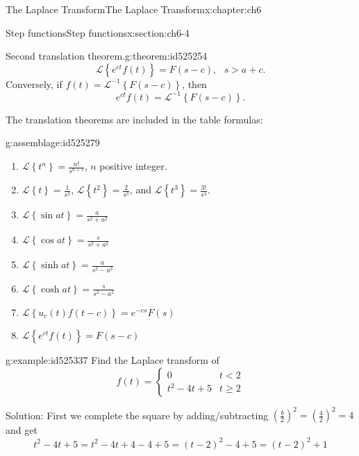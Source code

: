 \documentclass[oneside,10pt,]{book}
\numberwithin{equation}{section}
\numberwithin{equation}{section}
\newcommand{\lt}{<}
\newcommand{\amp}{&}
\begin{document}
\begin{chapterptx}{The Laplace Transform}{}{The Laplace Transform}{}{}{x:chapter:ch6}
\begin{sectionptx}{Step functions}{}{Step functions}{}{}{x:section:ch6-4}
\begin{theorem}{Second translation theorem.}{}{g:theorem:id525254}
\begin{equation*}
\mathcal{L}\left\{ e^{ct}f\left(t\right)\right\} =F(s-c),\,\,\,\,s>a+c.
\end{equation*}
Conversely, if \(f(t)=\mathcal{L}^{-1}\left\{ F(s-c)\right\} \), then%
\begin{equation*}
e^{ct}f(t)=\mathcal{L}^{-1}\left\{ F(s-c)\right\} .
\end{equation*}
%
\end{theorem}
The translation theorems are included in the table formulas:%
\begin{assemblage}{}{g:assemblage:id525279}%
%
\begin{enumerate}
\item{}\(\mathcal{L}\left\{ t^{n}\right\} =\frac{n!}{s^{n+1}}\), \(n\) positive integer.%
\item{}\(\mathcal{L}\left\{ t\right\} =\frac{1}{s^{2}}\), \(\mathcal{L}\left\{ t^{2}\right\} =\frac{2}{s^{3}}\), and \(\mathcal{L}\left\{ t^{3}\right\} =\frac{3!}{s^{4}}\).%
\item{}\(\displaystyle \mathcal{L}\left\{ \sin at\right\} =\frac{a}{s^{2}+a^{2}}\)%
\item{}\(\displaystyle \mathcal{L}\left\{ \cos at\right\} =\frac{s}{s^{2}+a^{2}}\)%
\item{}\(\displaystyle \mathcal{L}\left\{ \sinh at\right\} =\frac{a}{s^{2}-a^{2}}\)%
\item{}\(\displaystyle \mathcal{L}\left\{ \cosh at\right\} =\frac{s}{s^{2}-a^{2}}\)%
\item{}\(\displaystyle \mathcal{L}\left\{ u_{c}(t)f\left(t-c\right)\right\} =e^{-cs}F(s)\)%
\item{}\(\displaystyle \mathcal{L}\left\{ e^{ct}f\left(t\right)\right\} =F(s-c)\)%
\end{enumerate}
%
\end{assemblage}
\begin{example}{}{g:example:id525337}%
Find the Laplace transform of%
\begin{equation*}
f(t)=\begin{cases}
0 \amp t\lt 2\\
t^{2}-4t+5 \amp t\geq2
\end{cases}
\end{equation*}
%
\par
Solution: First we complete the square by adding\slash{}subtracting \(\left(\frac{b}{2}\right)^{2}=\left(\frac{4}{2}\right)^{2}=4\) and get%
\begin{equation*}
t^{2}-4t+5=t^{2}-4t+4-4+5=\left(t-2\right)^{2}-4+5=(t-2)^{2}+1

\end{equation*}
\end{example}
\end{sectionptx}
\end{chapterptx}
\end{document}

